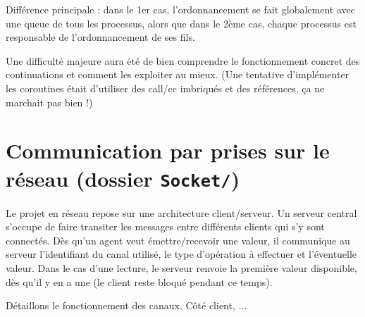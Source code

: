 \documentclass[a4paper, 11pt]{article}
\begin{document}
Différence principale : dans le 1er cas, l'ordonnancement se fait
globalement avec une queue de tous les processus, alors que dans le
2ème cas, chaque processus est responsable de l'ordonnancement de ses
fils.

Une difficulté majeure aura été de bien comprendre le fonctionnement
concret des continuations et comment les exploiter au mieux. (Une
tentative d'implémenter les coroutines était d'utiliser des call/cc
imbriqués et des références, ça ne marchait pas bien !)


\section*{Communication par prises sur le réseau (dossier \texttt{Socket/})}

Le projet en réseau repose sur une architecture client/serveur. Un
serveur central s'occupe de faire transiter les messages entre
différents clients qui s'y sont connectés. Dès qu'un agent veut émettre/recevoir
une valeur, il communique au serveur l'identifiant du canal utilisé,
le type d'opération à effectuer et l'éventuelle valeur. Dans le cas
d'une lecture, le serveur renvoie la première valeur disponible, dès
qu'il y en a une (le client reste bloqué pendant ce temps).

Détaillons le fonctionnement des canaux. Côté client, ...
\end{document}
